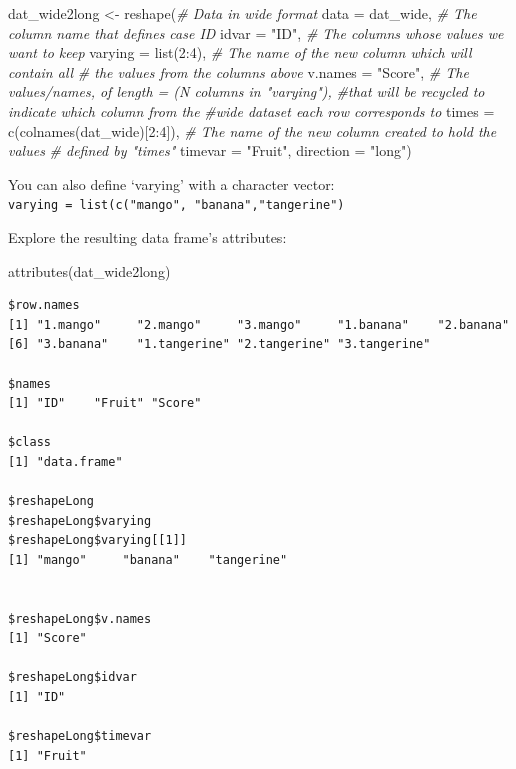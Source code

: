 \documentclass[
]{book}
\newenvironment{Shaded}{\begin{snugshade}}{\end{snugshade}}
\newcommand{\AttributeTok}[1]{\textcolor[rgb]{0.77,0.63,0.00}{#1}}
\newcommand{\CommentTok}[1]{\textcolor[rgb]{0.56,0.35,0.01}{\textit{#1}}}
\newcommand{\DecValTok}[1]{\textcolor[rgb]{0.00,0.00,0.81}{#1}}
\newcommand{\FunctionTok}[1]{\textcolor[rgb]{0.00,0.00,0.00}{#1}}
\newcommand{\NormalTok}[1]{#1}
\newcommand{\OtherTok}[1]{\textcolor[rgb]{0.56,0.35,0.01}{#1}}
\newcommand{\SpecialCharTok}[1]{\textcolor[rgb]{0.00,0.00,0.00}{#1}}
\newcommand{\StringTok}[1]{\textcolor[rgb]{0.31,0.60,0.02}{#1}}
\begin{document}
\begin{Shaded}
\begin{Highlighting}[]
\NormalTok{dat\_wide2long }\OtherTok{\textless{}{-}} \FunctionTok{reshape}\NormalTok{(}\CommentTok{\# Data in wide format}
                         \AttributeTok{data =}\NormalTok{ dat\_wide,}
                         \CommentTok{\# The column name that defines case ID}
                         \AttributeTok{idvar =} \StringTok{"ID"}\NormalTok{,}
                         \CommentTok{\# The columns whose values we want to keep}
                         \AttributeTok{varying =} \FunctionTok{list}\NormalTok{(}\DecValTok{2}\SpecialCharTok{:}\DecValTok{4}\NormalTok{),}
                         \CommentTok{\# The name of the new column which will contain all }
                         \CommentTok{\# the values from the columns above}
                         \AttributeTok{v.names =} \StringTok{"Score"}\NormalTok{,}
                         \CommentTok{\# The values/names, of length = (N columns in "varying"), }
                         \CommentTok{\#that will be recycled to indicate which column from the }
                         \CommentTok{\#wide dataset each row corresponds to}
                         \AttributeTok{times =} \FunctionTok{c}\NormalTok{(}\FunctionTok{colnames}\NormalTok{(dat\_wide)[}\DecValTok{2}\SpecialCharTok{:}\DecValTok{4}\NormalTok{]),}
                         \CommentTok{\# The name of the new column created to hold the values }
                         \CommentTok{\# defined by "times"}
                         \AttributeTok{timevar =} \StringTok{"Fruit"}\NormalTok{,                  }
                         \AttributeTok{direction =} \StringTok{"long"}\NormalTok{) }
\end{Highlighting}
\end{Shaded}

You can also define `varying' with a character vector:\\
\texttt{varying\ =\ list(c("mango",\ "banana","tangerine")}

Explore the resulting data frame's attributes:

\begin{Shaded}
\begin{Highlighting}[]
\FunctionTok{attributes}\NormalTok{(dat\_wide2long)}
\end{Highlighting}
\end{Shaded}

\begin{verbatim}
$row.names
[1] "1.mango"     "2.mango"     "3.mango"     "1.banana"    "2.banana"   
[6] "3.banana"    "1.tangerine" "2.tangerine" "3.tangerine"

$names
[1] "ID"    "Fruit" "Score"

$class
[1] "data.frame"

$reshapeLong
$reshapeLong$varying
$reshapeLong$varying[[1]]
[1] "mango"     "banana"    "tangerine"


$reshapeLong$v.names
[1] "Score"

$reshapeLong$idvar
[1] "ID"

$reshapeLong$timevar
[1] "Fruit"
\end{verbatim}
\end{document}
